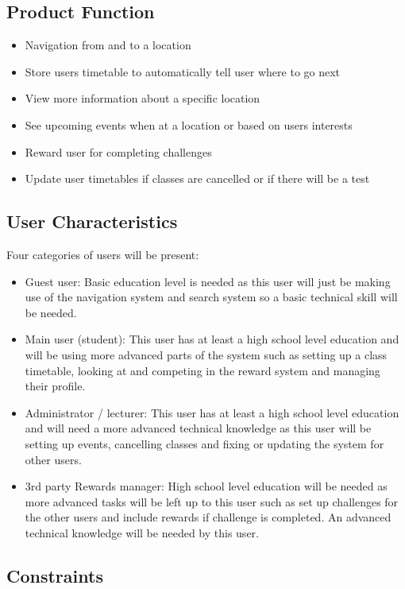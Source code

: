 \documentclass{article}
\begin{document}
	\subsection{Product Function}
	\begin{itemize}
	\item Navigation from and to a location
	\item Store users timetable to automatically tell user where to go next
	\item View more information about a specific location
	\item See upcoming events when at a location or based on users interests
	\item Reward user for completing challenges 
	\item Update user timetables if classes are cancelled or if there will be a test
	\end{itemize}
	\subsection{User Characteristics}
	Four categories of users will be present:
		\begin{itemize}

\item Guest user: Basic education level is needed as this user will just be making use of the navigation system and search system so a basic technical skill will be needed.
\item Main user (student): This user has at least a high school level education and will be using more advanced parts of the system such as setting up a class timetable, looking at and competing in the reward system and managing their profile.
\item Administrator / lecturer: This user has at least a high school level education and will need a more advanced technical knowledge as this user will be setting up events, cancelling classes and fixing or updating the system for other users.  
\item 3rd party Rewards manager: High school level education will be needed as more advanced tasks will be left up to this user such as set up challenges for the other users and include rewards if challenge is completed. An advanced technical knowledge will be needed by this user.

	\end{itemize}
	\subsection{Constraints}
\end{document}

